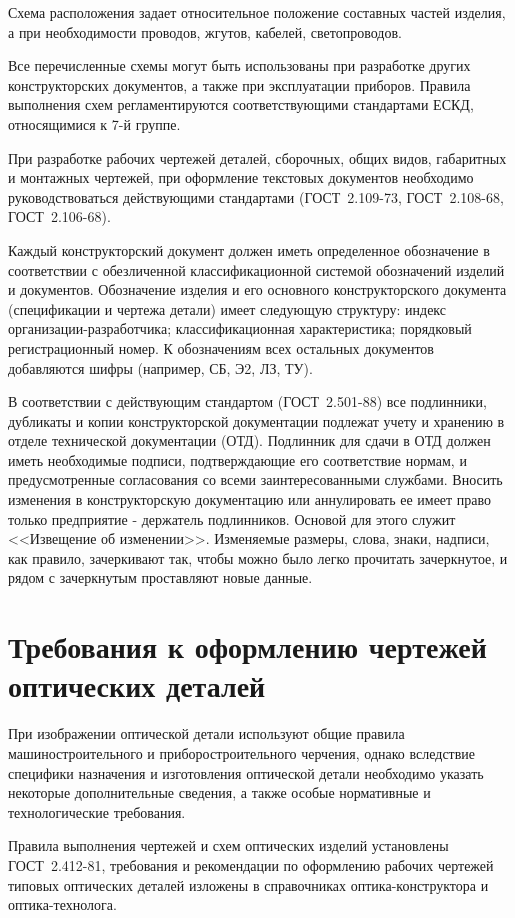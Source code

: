 Схема расположения задает относительное положение составных частей изделия, а при необходимости проводов, жгутов, кабелей, светопроводов.

Все перечисленные схемы могут быть использованы при разработке других конструкторских документов, а также при эксплуатации приборов. Правила выполнения схем регламентируются соответствующими стандартами ЕСКД, относящимися к 7-й группе.

При разработке рабочих чертежей деталей, сборочных, общих видов, габаритных и монтажных чертежей, при оформление текстовых документов необходимо руководствоваться действующими стандартами (ГОСТ~2.109-73, ГОСТ~2.108-68, ГОСТ~2.106-68).

Каждый конструкторский документ должен иметь определенное обозначение в соответствии с обезличенной классификационной системой обозначений изделий и документов. Обозначение изделия и его основного конструкторского документа (спецификации и чертежа детали) имеет следующую структуру: индекс организации-разработчика; классификационная характеристика; порядковый регистрационный номер. К обозначениям всех остальных документов добавляются шифры (например, СБ, Э2, ЛЗ, ТУ).

В соответствии с действующим стандартом (ГОСТ~2.501-88) все подлинники, дубликаты и копии конструкторской документации подлежат учету и хранению в отделе технической документации (ОТД). Подлинник для сдачи в ОТД должен иметь необходимые подписи, подтверждающие его соответствие нормам, и предусмотренные согласования со всеми заинтересованными службами. Вносить изменения в конструкторскую документацию или аннулировать ее имеет право только предприятие - держатель подлинников. Основой для этого служит <<Извещение об изменении>>. Изменяемые размеры, слова, знаки, надписи, как правило, зачеркивают так, чтобы можно было легко прочитать зачеркнутое, и рядом с зачеркнутым проставляют новые данные.

\section{Требования к оформлению чертежей оптических деталей}

При изображении оптической детали используют общие правила машиностроительного и приборостроительного черчения, однако вследствие специфики назначения и изготовления оптической детали необходимо указать некоторые дополнительные сведения, а также особые нормативные и технологические требования.

Правила выполнения чертежей и схем оптических изделий установлены ГОСТ~2.412-81, требования и рекомендации по оформлению рабочих чертежей типовых оптических деталей изложены в справочниках оптика-конструктора и оптика-технолога.

